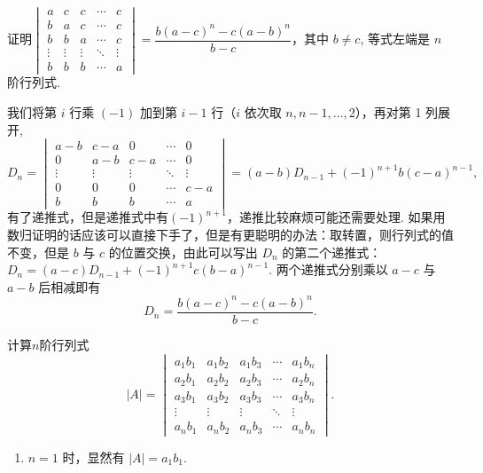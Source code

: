 \begin{exercise}
\begin{exgroup}
        \item 证明$\begin{vmatrix}
                a      & c      & c      & \cdots & c      \\
                b      & a      & c      & \cdots & c      \\
                b      & b      & a      & \cdots & c      \\
                \vdots & \vdots & \vdots & \ddots & \vdots \\
                b      & b      & b      & \cdots & a
            \end{vmatrix}=\dfrac{b(a-c)^{n}-c(a-b)^{n}}{b-c}$，其中 $b \neq c$, 等式左端是 $n$ 阶行列式.
        \begin{answer}
            我们将第 $i$ 行乘 $(-1)$ 加到第 $i-1$ 行（$i$ 依次取 $n, n-1, \ldots, 2$），再对第 1 列展开,
            \[D_{n}=\begin{vmatrix}
                    a-b    & c-a    & 0      & \cdots & 0      \\
                    0      & a-b    & c-a    & \cdots & 0      \\
                    \vdots & \vdots & \vdots & \ddots & \vdots \\
                    0      & 0      & 0      & \cdots & c-a    \\
                    b      & b      & b      & \cdots & a
                \end{vmatrix}=(a-b)D_{n-1}+(-1)^{n+1}b(c-a)^{n-1},\]
            有了递推式，但是递推式中有$(-1)^{n+1}$，递推比较麻烦可能还需要处理. 如果用数归证明的话应该可以直接下手了，但是有更聪明的办法：取转置，则行列式的值不变，但是 $b$ 与 $c$ 的位置交换，由此可以写出 $D_n$ 的第二个递推式：$D_n=(a-c)D_{n-1}+(-1)^{n+1}c(b-a)^{n-1}$. 两个递推式分别乘以 $a-c$ 与 $a-b$ 后相减即有
            \[
                D_n=\dfrac{b(a-c)^{n}-c(a-b)^{n}}{b-c}.
            \]
            \end{answer}

        \item 计算$n$阶行列式
        \[|A|=\begin{vmatrix}
                a_1b_1 & a_1b_2 & a_1b_3 & \cdots & a_1b_n \\
                a_2b_1 & a_2b_2 & a_2b_3 & \cdots & a_2b_n \\
                a_3b_1 & a_3b_2 & a_3b_3 & \cdots & a_3b_n \\
                \vdots & \vdots & \vdots & \ddots & \vdots \\
                a_nb_1 & a_nb_2 & a_nb_3 & \cdots & a_nb_n
            \end{vmatrix}.\]
        \begin{answer}
            \begin{enumerate}
                \item $n=1$ 时，显然有 $|A|=a_1b_1$.


\end{enumerate}
\end{answer}
\end{exgroup}
\end{exercise}
